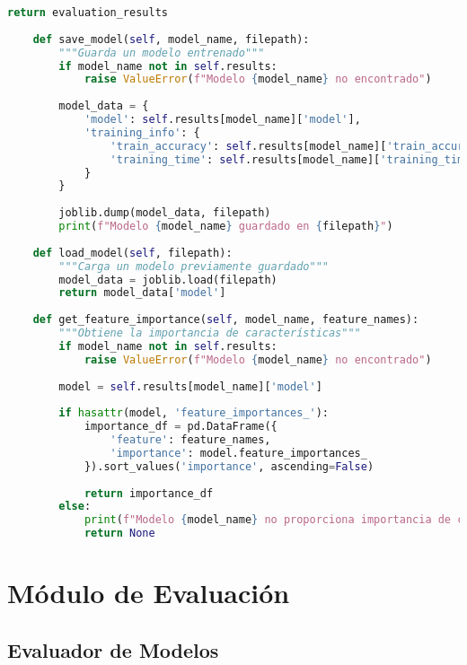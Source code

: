 \begin{lstlisting}[language=Python, caption=Módulo de entrenamiento de modelos]
        return evaluation_results
    
    def save_model(self, model_name, filepath):
        """Guarda un modelo entrenado"""
        if model_name not in self.results:
            raise ValueError(f"Modelo {model_name} no encontrado")
        
        model_data = {
            'model': self.results[model_name]['model'],
            'training_info': {
                'train_accuracy': self.results[model_name]['train_accuracy'],
                'training_time': self.results[model_name]['training_time']
            }
        }
        
        joblib.dump(model_data, filepath)
        print(f"Modelo {model_name} guardado en {filepath}")
    
    def load_model(self, filepath):
        """Carga un modelo previamente guardado"""
        model_data = joblib.load(filepath)
        return model_data['model']
    
    def get_feature_importance(self, model_name, feature_names):
        """Obtiene la importancia de características"""
        if model_name not in self.results:
            raise ValueError(f"Modelo {model_name} no encontrado")
        
        model = self.results[model_name]['model']
        
        if hasattr(model, 'feature_importances_'):
            importance_df = pd.DataFrame({
                'feature': feature_names,
                'importance': model.feature_importances_
            }).sort_values('importance', ascending=False)
            
            return importance_df
        else:
            print(f"Modelo {model_name} no proporciona importancia de características")
            return None
\end{lstlisting}

\section{Módulo de Evaluación}

\subsection{Evaluador de Modelos}

